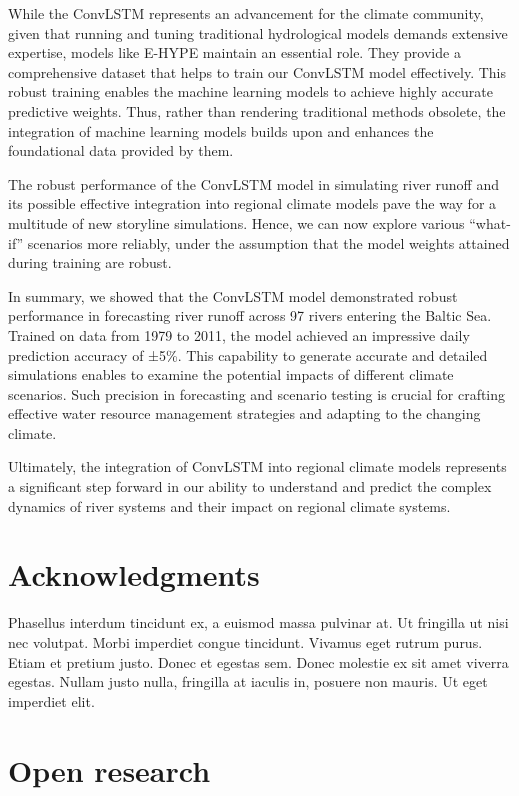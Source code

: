 \documentclass[
]{agujournal2019}
\begin{document}
While the ConvLSTM represents an advancement for the climate community,
given that running and tuning traditional hydrological models demands
extensive expertise, models like E-HYPE maintain an essential role. They
provide a comprehensive dataset that helps to train our ConvLSTM model
effectively. This robust training enables the machine learning models to
achieve highly accurate predictive weights. Thus, rather than rendering
traditional methods obsolete, the integration of machine learning models
builds upon and enhances the foundational data provided by them.

The robust performance of the ConvLSTM model in simulating river runoff
and its possible effective integration into regional climate models pave
the way for a multitude of new storyline simulations. Hence, we can now
explore various ``what-if'' scenarios more reliably, under the
assumption that the model weights attained during training are robust.

In summary, we showed that the ConvLSTM model demonstrated robust
performance in forecasting river runoff across 97 rivers entering the
Baltic Sea. Trained on data from 1979 to 2011, the model achieved an
impressive daily prediction accuracy of ±5\%. This capability to
generate accurate and detailed simulations enables to examine the
potential impacts of different climate scenarios. Such precision in
forecasting and scenario testing is crucial for crafting effective water
resource management strategies and adapting to the changing climate.

Ultimately, the integration of ConvLSTM into regional climate models
represents a significant step forward in our ability to understand and
predict the complex dynamics of river systems and their impact on
regional climate systems.

\section{Acknowledgments}\label{acknowledgments}

Phasellus interdum tincidunt ex, a euismod massa pulvinar at. Ut
fringilla ut nisi nec volutpat. Morbi imperdiet congue tincidunt.
Vivamus eget rutrum purus. Etiam et pretium justo. Donec et egestas sem.
Donec molestie ex sit amet viverra egestas. Nullam justo nulla,
fringilla at iaculis in, posuere non mauris. Ut eget imperdiet elit.

\section{Open research}\label{open-research}
\end{document}
